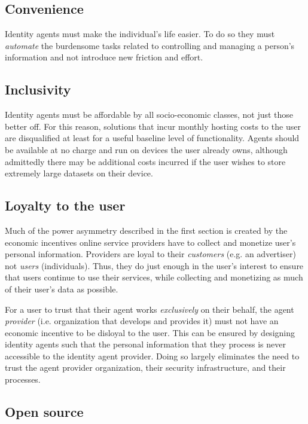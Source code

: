 \documentclass[11pt, oneside]{article}   	%
\begin{document}
\subsection{Convenience}

Identity agents must make the individual's life easier. To do so they must \emph{automate} the burdensome tasks related to controlling and managing a person's information and not introduce new friction and effort.

\subsection{Inclusivity}

Identity agents must be affordable by all socio-economic classes, not just those better off. For this reason, solutions that incur monthly hosting costs to the user are disqualified at least for a useful baseline level of functionality. Agents should be available at no charge and run on devices the user already owns, although admittedly there may be additional costs incurred if the user wishes to store extremely large datasets on their device.

\subsection{Loyalty to the user}
Much of the power asymmetry described in the first section is created by the economic incentives online service providers have to collect and monetize user's personal information. Providers are loyal to their \emph{customers} (e.g. an advertiser) not \emph{users} (individuals). Thus, they do just enough in the user's interest to ensure that users continue to use their services, while collecting and monetizing as much of their user's data as possible.  

For a user to trust that their agent works \emph{exclusively} on their behalf, the agent \emph{provider} (i.e. organization that develops and provides it) must not have an economic incentive to be disloyal to the user. This can be ensured by designing identity agents such that the personal information that they process is never accessible to the identity agent provider. Doing so largely eliminates the need to trust the agent provider organization, their security infrastructure, and their processes.

\subsection{Open source}
\end{document}
